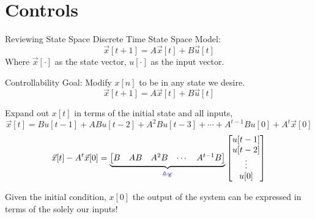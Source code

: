 \section{Controls}

\begin{frame}{Reviewing State Space}
    Discrete Time State Space Model:
    \[
        \vec x[t+1] = A \vec x[t] + B \vec u[t]
    \]
    Where \(\vec x[\cdot]\) as the state vector, \(u[\cdot]\) as the input vector.
\end{frame}


\begin{frame}{Controllability}
    Goal: Modify \(x[n]\) to be in any state we desire.
    \[
        \vec x[t+1] = A \vec x[t] + B \vec u[t]
    \]

    Expand out \(x[t]\) in terms of the initial state and all inputs,
    \[
        \vec x[t] = B u[t - 1]
                + A B u[t - 2]
                + A^2 B u[t - 3] + \cdots
                + A^{t - 1} B u[0]
                + A^t \vec x[0]
    \]
    \[
        \vec x[t] - A^t \vec x[0] =
        \underbrace{\begin{bmatrix}
            B & AB & A^2 B & \cdots & A^{t - 1} B
        \end{bmatrix}}_{\color{blue}\triangleq \mathscr{C}}
        \begin{bmatrix}
            u[t - 1] \\
            u[t - 2] \\
            \vdots \\
            u[0] \\
        \end{bmatrix}
    \]

    \pause
    Given the initial condition, \(x[0]\) the output of the system can be  expressed in terms of the solely our inputs!
\end{frame}

